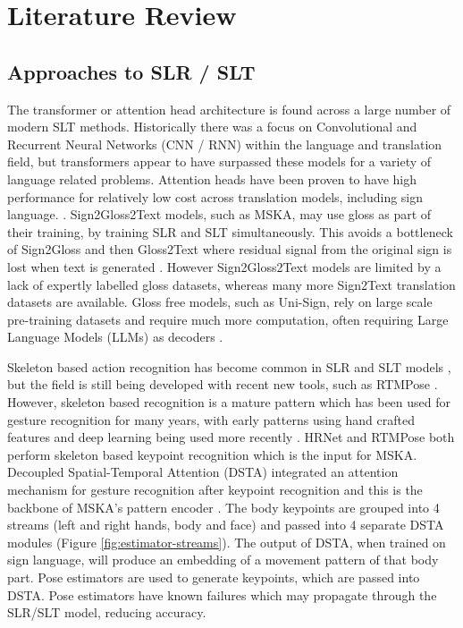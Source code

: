 \documentclass{article}
\begin{document}
\section{Literature Review}

\subsection{Approaches to SLR / SLT}
The transformer or attention head architecture is found across a large number of modern SLT methods. Historically there was a focus on Convolutional and Recurrent Neural Networks (CNN / RNN) within the language and translation field, but transformers appear to have surpassed these models for a variety of language related problems. Attention heads have been proven to have high performance for relatively low cost across translation models, including sign language. \cite{vaswani_attention_2023} \cite{camgoz_sign_2020} \cite{chen_two-stream_2023}. Sign2Gloss2Text models, such as MSKA, may use gloss as part of their training, by training SLR and SLT simultaneously. This avoids a bottleneck of Sign2Gloss and then Gloss2Text where residual signal from the original sign is lost when text is generated \cite{yin_better_2020} \cite{lin_gloss-free_2023}. However Sign2Gloss2Text models are limited by a lack of expertly labelled gloss datasets, whereas many more Sign2Text translation datasets are available. Gloss free models, such as Uni-Sign, rely on large scale pre-training datasets and require much more computation, often requiring Large Language Models (LLMs) as decoders \cite{li_uni-sign_2025}.

Skeleton based action recognition has become common in SLR and SLT models \cite{guan_multi-stream_2024} \cite{hu_signbert_2023}  \cite{gueuwou_shubert_2025}, but the field is still being developed with recent new tools, such as RTMPose \cite{jiang_rtmpose_2023}. However, skeleton based recognition is a mature pattern which has been used for gesture recognition for many years, with early patterns using hand crafted features and deep learning being used more recently \cite{yan_spatial_2018} \cite{shi_decoupled_2020}. HRNet \cite{wang_deep_2020} and RTMPose both perform skeleton based keypoint recognition which is the input for MSKA. Decoupled Spatial-Temporal Attention (DSTA) integrated an attention mechanism for gesture recognition after keypoint recognition and this is the backbone of MSKA's pattern encoder \cite{shi_decoupled_2020}. The body keypoints are grouped into 4 streams (left and right hands, body and face) and passed into 4 separate DSTA modules (Figure \ref{fig:estimator-streams}). The output of DSTA, when trained on sign language, will produce an embedding of a movement pattern of that body part. Pose estimators are used to generate keypoints, which are passed into DSTA. Pose estimators have known failures which may propagate through the SLR/SLT model, reducing accuracy. 
\end{document}
